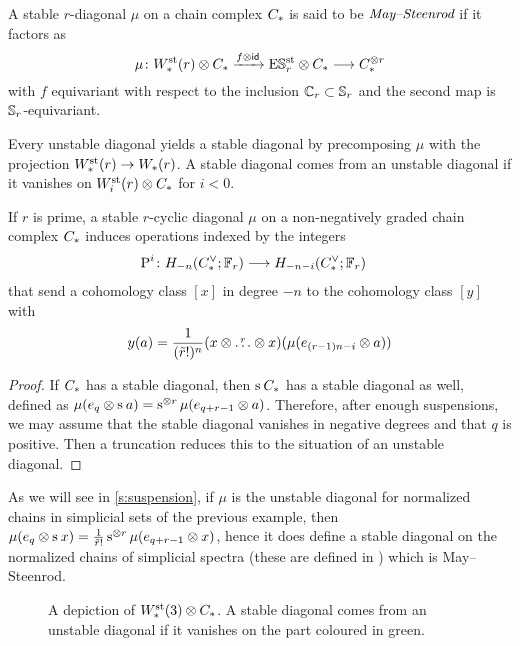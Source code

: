 \begin{definition}
	A stable $r$-diagonal $\mu$ on a chain complex $\ucadenas$ is said to be $\emph{May--Steenrod}$ if it factors as
	\[
	\mu \colon \Wst(r) \ot \ucadenas \xra{f \ot \id} \ESst_r \ot \ucadenas \lra \ucadenas^{\ot r}
	\]
	with $f$ equivariant with respect to the inclusion $\Cyc_r \subset \Sym_r$ and the second map is $\Sym_r$-equivariant.
\end{definition}

Every unstable diagonal yields a stable diagonal by precomposing $\mu$ with the projection $\Wst(r) \to \W(r)$.
A stable diagonal comes from an unstable diagonal if it vanishes on $\Wst[i](r) \ot \ucadenas$ for $i<0$.

\begin{proposition}
	If $r$ is prime, a stable $r$-cyclic diagonal $\mu$ on a non-negatively graded chain complex $\ucadenas$ induces operations indexed by the integers
	\begin{align*}
		\power^{i} \colon H_{-n}(\ucocadenas;\mathbb{F}_r)& \lra H_{-n-i}(\ucocadenas;\mathbb{F}_r)
	\end{align*}
	that send a cohomology class $[x]$ in degree $-n$ to the cohomology class $[y]$ with
	\[
	y(a) = \frac{1}{(\tilde{r}!)^n}(x \ot \overset{r}{\dots} \ot x)(\mu(e_{(r-1)n-i} \ot a))
	\]
\end{proposition}

\begin{proof} If $\ucadenas$ has a stable diagonal, then $\sus{} \ucadenas$ has a stable diagonal as well, defined as $\mu(e_q \ot \sus{} a) = \sus{\ot r}\mu(e_{q+r-1} \ot a)$.
	Therefore, after enough suspensions, we may assume that the stable diagonal vanishes in negative degrees and that $q$ is positive.
	Then a truncation reduces this to the situation of an unstable diagonal.
\end{proof}

\begin{example}
	As we will see in \cref{s:suspension}, if $\mu$ is the unstable diagonal for normalized chains in simplicial sets of the previous example, then $\mu(e_q \ot \sus{} x) = \frac{1}{\tilde{r}!}\sus{\ot r} \mu(e_{q+r-1} \ot x)$, hence it does define a stable diagonal on the normalized chains of simplicial spectra (these are defined in \cite{Gill2020}) which is May--Steenrod.
\end{example}

\begin{figure}
	
	\caption{A depiction of $\Wst(3) \ot \ucadenas$. A stable diagonal comes from an unstable diagonal if it vanishes on the part coloured in green.}
\end{figure}

